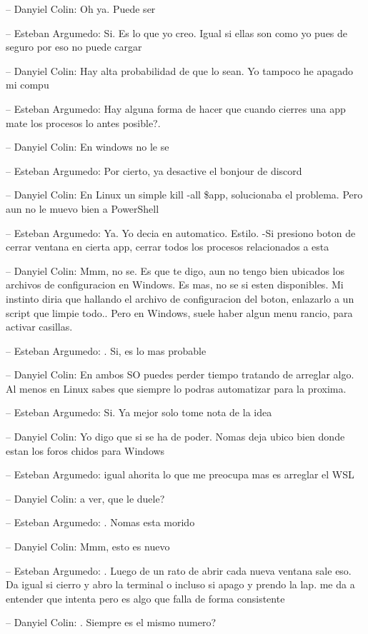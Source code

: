 -- Danyiel Colin: Oh ya. Puede ser

-- Esteban Argumedo: Si. Es lo que yo creo. Igual si ellas son como yo
pues de seguro por eso no puede cargar

-- Danyiel Colin: Hay alta probabilidad de que lo sean. Yo tampoco he
apagado mi compu

-- Esteban Argumedo: Hay alguna forma de hacer que cuando cierres una
app mate los procesos lo antes posible?.

-- Danyiel Colin: En windows no le se

-- Esteban Argumedo: Por cierto, ya desactive el bonjour de discord

-- Danyiel Colin: En Linux un simple kill -all \$app, solucionaba el
problema. Pero aun no le muevo bien a PowerShell

-- Esteban Argumedo: Ya. Yo decia en automatico. Estilo. -Si presiono
boton de cerrar ventana en cierta app, cerrar todos los procesos
relacionados a esta

-- Danyiel Colin: Mmm, no se. Es que te digo, aun no tengo bien ubicados
los archivos de configuracion en Windows. Es mas, no se si esten
disponibles. Mi instinto diria que hallando el archivo de configuracion
del boton, enlazarlo a un script que limpie todo.. Pero en Windows,
suele haber algun menu rancio, para activar casillas.

-- Esteban Argumedo: . Si, es lo mas probable

-- Danyiel Colin: En ambos SO puedes perder tiempo tratando de arreglar
algo. Al menos en Linux sabes que siempre lo podras automatizar para la
proxima.

-- Esteban Argumedo: Si. Ya mejor solo tome nota de la idea

-- Danyiel Colin: Yo digo que si se ha de poder. Nomas deja ubico bien
donde estan los foros chidos para Windows

-- Esteban Argumedo: igual ahorita lo que me preocupa mas es arreglar el
WSL

-- Danyiel Colin: a ver, que le duele?

-- Esteban Argumedo: . Nomas esta morido

-- Danyiel Colin: Mmm, esto es nuevo

-- Esteban Argumedo: . Luego de un rato de abrir cada nueva ventana sale
eso. Da igual si cierro y abro la terminal o incluso si apago y prendo
la lap. me da a entender que intenta pero es algo que falla de forma
consistente

-- Danyiel Colin: . Siempre es el mismo numero?

